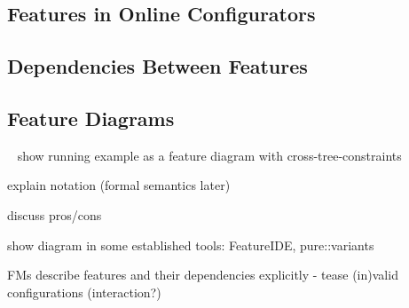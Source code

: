 

\subsection{Features in Online Configurators}

\subsection{Dependencies Between Features}








\subsection{Feature Diagrams} %

\begin{frame}{~}
show running example as a feature diagram with cross-tree-constraints

explain notation (formal semantics later)

discuss pros/cons

show diagram in some established tools: FeatureIDE, pure::variants

FMs describe features and their dependencies explicitly - tease (in)valid configurations (interaction?)
\end{frame}

%

